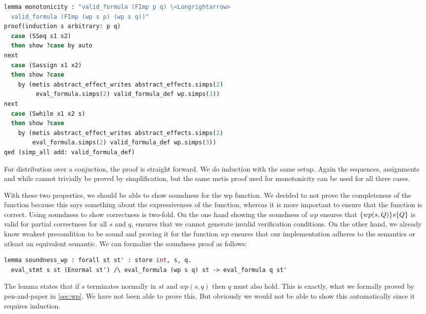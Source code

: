 \begin{lstlisting}[caption={Proof of monotonicity in Isabelle},label={lst:isamono},language=sml]
lemma monotonicity : "valid_formula (FImp p q) \<Longrightarrow>
  valid_formula (FImp (wp s p) (wp s q))"
proof(induction s arbitrary: p q)
  case (SSeq s1 s2)
  then show ?case by auto
next
  case (Sassign x1 x2)
  then show ?case
    by (metis abstract_effect_writes abstract_effects.simps(2)
         eval_formula.simps(2) valid_formula_def wp.simps(3))
next
  case (Swhile x1 x2 s)
  then show ?case
    by (metis abstract_effect_writes abstract_effects.simps(2)
        eval_formula.simps(2) valid_formula_def wp.simps(3))
qed (simp_all add: valid_formula_def)
\end{lstlisting}

For distribution over a conjuction, the proof is straight forward.
We do induction with the same setup.
Again the sequences, assignments and while cannot trivially be proved by simplification,
but the same metis proof used for monotonicity can be used for all three cases.

With these two properties, we should be able to show soundness for the wp function.
We decided to not prove the completeness of the function because this says something about the expressiveness of the function, whereas it is more important to ensure that
the function is correct.
Using soundness to show correctness is two-fold.
On the one hand showing the soundness of $wp$ ensures that $\{wp(s,Q)\}s\{Q\}$ is valid for partial correctness for all $s$ and $q$, ensures that we cannot generate invalid verification conditions.
On the other hand, we already know weakest precondition to be sound and proving it for the function $wp$ ensures that our implementation adheres to the semantics or atleast an equivalent semantic.
We can formalize the soundness proof as follows:

\begin{lstlisting}[caption={WLP soundness lemma in Why3},label={lst:isamono},language=sml]
  lemma soundness_wp : forall st st' : store int, s, q.
  eval_stmt s st (Enormal st') /\ eval_formula (wp s q) st -> eval_formula q st'
\end{lstlisting}

The lemma states that if $s$ terminates normally in $st$ and $wp(s,q)$ then $q$ must also hold.
This is exactly, what we formally proved by pen-and-paper in \ref{sec:wp}.
We have not been able to prove this. But obviously we would not be able to show this automatically since it requires induction.

